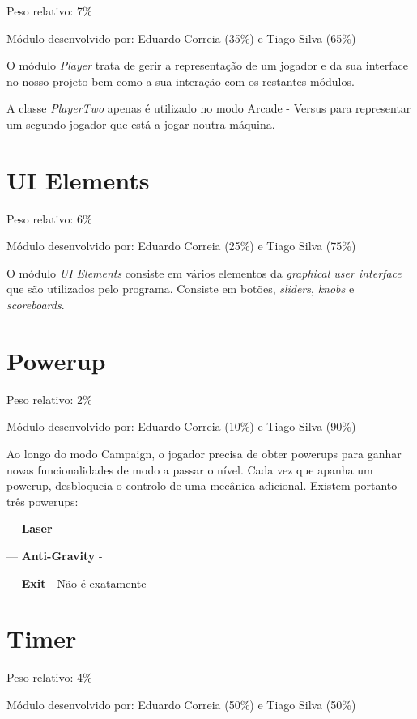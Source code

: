 \documentclass{report}
\begin{document}
Peso relativo: 7\%

Módulo desenvolvido por: Eduardo Correia (35\%) e Tiago Silva (65\%) 
\newline

O módulo \textit{Player} trata de gerir a representação de um jogador e da sua interface no nosso projeto bem como a sua interação com os restantes módulos. 

A classe \textit{PlayerTwo} apenas é utilizado no modo Arcade - Versus para representar um segundo jogador que está a jogar noutra máquina. 

\section{UI Elements}

Peso relativo: 6\%

Módulo desenvolvido por: Eduardo Correia (25\%) e Tiago Silva (75\%) 
\newline

O módulo \textit{UI Elements} consiste em vários elementos da \textit{graphical user interface} que são utilizados pelo programa. Consiste em botões, \textit{sliders}, \textit{knobs} e \textit{scoreboards}.\footnotemark

\section{Powerup}

Peso relativo: 2\%

Módulo desenvolvido por: Eduardo Correia (10\%) e Tiago Silva (90\%)
\newline

Ao longo do modo Campaign, o jogador precisa de obter powerups para ganhar novas funcionalidades de modo a passar o nível. Cada vez que apanha um powerup, desbloqueia o controlo de uma mecânica adicional.
Existem portanto três powerups:
\newline

--- \textbf{Laser} - 

--- \textbf{Anti-Gravity} -

--- \textbf{Exit} - Não é exatamente 	

\section{Timer}

Peso relativo: 4\%

Módulo desenvolvido por: Eduardo Correia (50\%) e Tiago Silva (50\%)
\newline
\end{document}
